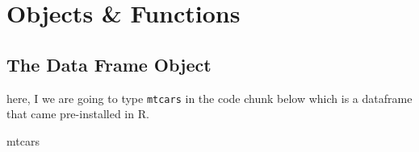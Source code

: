 \documentclass[
]{book}
\newenvironment{Shaded}{\begin{snugshade}}{\end{snugshade}}
\newcommand{\NormalTok}[1]{#1}
\begin{document}
\hypertarget{objects-functions}{%
\section{Objects \& Functions}\label{objects-functions}}

\hypertarget{the-data-frame-object}{%
\subsection{The Data Frame Object}\label{the-data-frame-object}}

here, I we are going to type \texttt{mtcars} in the code chunk below which is a dataframe that came pre-installed in R.

\begin{Shaded}
\begin{Highlighting}[]
\NormalTok{mtcars}
\end{Highlighting}
\end{Shaded}
\end{document}
